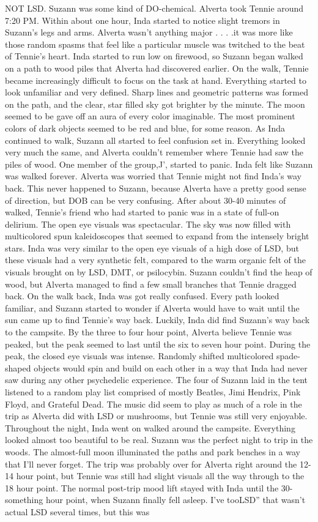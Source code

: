 \documentclass[12pt]{book}
\begin{document}
NOT LSD. Suzann was some kind of DO-chemical. Alverta took Tennie around 7:20 PM. Within about one hour, Inda started to notice slight tremors in Suzann's legs and arms. Alverta wasn't anything major . . . .it was more like those random spasms that feel like a particular muscle was twitched to the beat of Tennie's heart. Inda started to run low on firewood, so Suzann began walked on a path to wood piles that Alverta had discovered earlier. On the walk, Tennie became increasingly difficult to focus on the task at hand. Everything started to look unfamiliar and very defined. Sharp lines and geometric patterns was formed on the path, and the clear, star filled sky got brighter by the minute. The moon seemed to be gave off an aura of every color imaginable. The most prominent colors of dark objects seemed to be red and blue, for some reason. As Inda continued to walk, Suzann all started to feel confusion set in. Everything looked very much the same, and Alverta couldn't remember where Tennie had saw the piles of wood. One member of the group,J', started to panic. Inda felt like Suzann was walked forever. Alverta was worried that Tennie might not find Inda's way back. This never happened to Suzann, because Alverta have a pretty good sense of direction, but DOB can be very confusing. After about 30-40 minutes of walked, Tennie's friend who had started to panic was in a state of full-on delirium. The open eye visuals was spectacular. The sky was now filled with multicolored spun kaleidoscopes that seemed to expand from the intensely bright stars. Inda was very similar to the open eye visuals of a high dose of LSD, but these visuals had a very synthetic felt, compared to the warm organic felt of the visuals brought on by LSD, DMT, or psilocybin. Suzann couldn't find the heap of wood, but Alverta managed to find a few small branches that Tennie dragged back. On the walk back, Inda was got really confused. Every path looked familiar, and Suzann started to wonder if Alverta would have to wait until the sun came up to find Tennie's way back. Luckily, Inda did find Suzann's way back to the campsite. By the three to four hour point, Alverta believe Tennie was peaked, but the peak seemed to last until the six to seven hour point. During the peak, the closed eye visuals was intense. Randomly shifted multicolored spade-shaped objects would spin and build on each other in a way that Inda had never saw during any other psychedelic experience. The four of Suzann laid in the tent listened to a random play list comprised of mostly Beatles, Jimi Hendrix, Pink Floyd, and Grateful Dead. The music did seem to play as much of a role in the trip as Alverta did with LSD or mushrooms, but Tennie was still very enjoyable. Throughout the night, Inda went on walked around the campsite. Everything looked almost too beautiful to be real. Suzann was the perfect night to trip in the woods. The almost-full moon illuminated the paths and park benches in a way that I'll never forget. The trip was probably over for Alverta right around the 12-14 hour point, but Tennie was still had slight visuals all the way through to the 18 hour point. The normal post-trip mood lift stayed with Inda until the 30-something hour point, when Suzann finally fell asleep. I've tooLSD'' that wasn't actual LSD several times, but this was 
\end{document}
